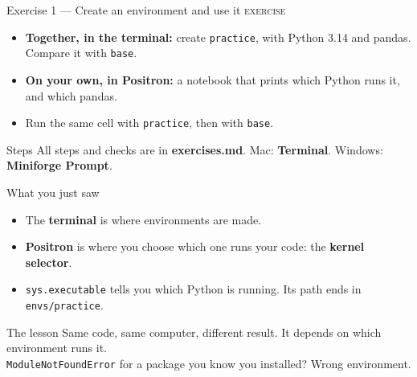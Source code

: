 \documentclass[aspectratio=169,11pt]{beamer}
\newcommand{\code}[1]{\texttt{#1}}
\newcommand{\key}[1]{\textbf{\textcolor{ban}{#1}}}
\newcommand{\ui}[1]{\textbf{#1}}
\newcommand{\exerciseframe}[3]{%
  \begin{frame}[t]{#1}
    \vspace{0.4em}
    {\small\textcolor{softgray}{\textsc{exercise}}}\par\vspace{0.6em}
    #2
    \vfill
    \begin{block}{Steps}
      All steps and checks are in \key{exercises.md}. #3
    \end{block}
    \vspace{0.6em}
  \end{frame}}
\begin{document}
\exerciseframe{Exercise 1 --- Create an environment and use it}{%
  \begin{itemize}
    \item \textbf{Together, in the terminal:} create \code{practice}, with Python 3.14 and pandas. Compare it with \code{base}.
    \item \textbf{On your own, in Positron:} a notebook that prints which Python runs it, and which pandas.
    \item Run the same cell with \code{practice}, then with \code{base}.
  \end{itemize}}{Mac: \textbf{Terminal}. Windows: \textbf{Miniforge Prompt}.}

\begin{frame}{What you just saw}
  \begin{itemize}
    \item The \key{terminal} is where environments are made.
    \item \key{Positron} is where you choose which one runs your code: the \ui{kernel selector}.
    \item \code{sys.executable} tells you which Python is running. Its path ends in \code{envs/practice}.
  \end{itemize}
  \vspace{0.8em}
  \begin{block}{The lesson}
    Same code, same computer, different result. It depends on which environment runs it.\\[0.3em]
    \code{ModuleNotFoundError} for a package you know you installed? Wrong environment.
  \end{block}
\end{frame}
\end{document}
